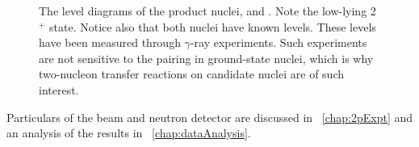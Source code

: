 \begin{figure}[!htbp]
\centering
{}
\caption{The level diagrams of the product nuclei,  and .  Note the low-lying 2$^+$ state.  Notice also that both nuclei have known \zp levels.  These levels have been measured through $\gamma$-ray experiments.  Such experiments are not sensitive to the pairing in ground-state nuclei, which is why two-nucleon transfer reactions on \zvbb candidate nuclei are of such interest.}
\label{fig:levelDiagrams}
\end{figure}
Particulars of the beam and neutron detector are discussed in {\chap}~\ref{chap:2pExpt} and an analysis of the results in {\chap}~\ref{chap:dataAnalysis}.
%
% 
% 
